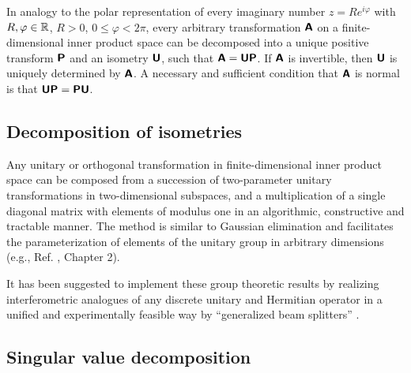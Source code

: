 In analogy to the polar representation of every imaginary number $z= R e^{i\varphi}$ with $R,\varphi \in {\Bbb R}$, $R>0$,
$0\le \varphi < 2\pi$,
every arbitrary transformation $\textsf{\textbf{A}}$ on a finite-dimensional inner product space can be decomposed into
a unique positive transform
$\textsf{\textbf{P}}$ and an isometry
$\textsf{\textbf{U}}$, such that $\textsf{\textbf{A}}= \textsf{\textbf{U}} \textsf{\textbf{P}}$.
If $\textsf{\textbf{A}}$ is invertible, then $\textsf{\textbf{U}}$  is uniquely determined by
$\textsf{\textbf{A}}$.
A necessary and sufficient condition that $\textsf{\textbf{A}}$ is normal is that
$\textsf{\textbf{U}} \textsf{\textbf{P}}=\textsf{\textbf{P}} \textsf{\textbf{U}} $.

\subsection{Decomposition of isometries}

Any unitary or orthogonal transformation   in finite-dimensional inner product space
can be composed from a succession of two-parameter unitary transformations in
two-dimensional subspaces,
and a multiplication of a single diagonal matrix with elements of modulus one
in an algorithmic, constructive and tractable manner.
The method is similar to Gaussian elimination and facilitates the parameterization of elements
of the unitary group  in arbitrary dimensions (e.g., Ref. \cite{murnaghan}, Chapter 2).

{\color{Purple}
It has been suggested to implement
these group theoretic results by realizing interferometric analogues
of any discrete unitary and Hermitian operator
in a unified and experimentally feasible way by ``generalized beam splitters''   \cite{rzbb,reck-94}.}


\subsection{Singular value decomposition}

